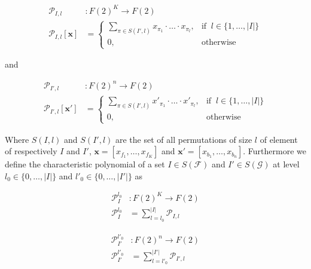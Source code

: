 \documentclass[a4paper, 11pt]{article}
\begin{document}
\begin{align*}
\mathcal{P}_{I, l}&: F(2)^{K} \rightarrow F(2)\\
\mathcal{P}_{I, l} [\textbf{x}] &= \begin{cases} \sum_{\pi \in S(I', l)} x_{\pi_1} \cdot \ldots \cdot x_{\pi_l}, & \text{if }\ l \in \lbrace 1, \ldots, \vert I \vert \rbrace \\ 0, & \text{otherwise} \end{cases}
\end{align*}

and 

\begin{align*}
\mathcal{P}_{I', l}&: F(2)^{n} \rightarrow F(2)\\
\mathcal{P}_{I', l} [\textbf{x}'] &= \begin{cases} \sum_{\pi \in S(I', l)} x'_{\pi_1} \cdot \ldots \cdot x'_{\pi_l}, & \text{if }\ l \in \lbrace 1, \ldots, \vert I \vert \rbrace \\ 0, & \text{otherwise} \end{cases}
\end{align*}


Where $S(I, l)$ and $S(I', l)$ are the set of all permutations of size $l$ of element of respectively $I$ and $I'$, $\textbf{x} = [x_{f_1}, \ldots, x_{f_K}]$ and $\textbf{x}' = [x_{b_1}, \ldots, x_{b_n}]$. Furthermore we define the characteristic polynomial of a set $I \in S(\mathcal{F})$ and $I' \in S(\mathcal{G})$ at level $l_0 \in \{0, \ldots, \vert I \vert \}$ and $l'_0 \in \{0, \ldots, \vert I' \vert \}$  as 

\vspace{10px}\noindent\begin{minipage}{.5\linewidth}
\begin{align*}
\mathcal{P}^{l_0}_{I} &: F(2)^{K} \rightarrow F(2)\\
\mathcal{P}^{l_0}_{I} &= \sum_{l = l_0}^{\vert I \vert} \mathcal{P}_{I, l}
\end{align*}
\end{minipage}%
\noindent\begin{minipage}{.5\linewidth}
\begin{align*}
\mathcal{P}^{l'_0}_{I'} &: F(2)^{n} \rightarrow F(2)\\
\mathcal{P}^{l'_0}_{I'} &= \sum_{l = l'_0}^{\vert I' \vert} \mathcal{P}_{I', l}
\end{align*}
\end{minipage}\vspace{15px}
\end{document}
